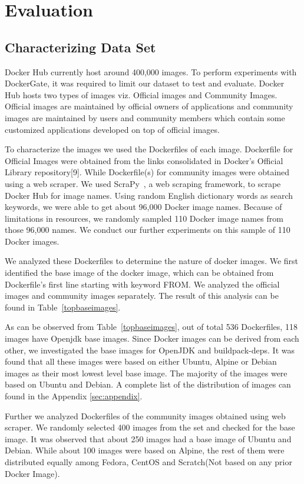 \section{Evaluation}
\label{sec:eval}

\subsection{Characterizing Data Set}

Docker Hub currently host around 400,000 images. To perform experiments with DockerGate, it was required to limit our dataset to test and evaluate. Docker Hub hosts two types of images viz. Official images and Community Images. Official images are maintained by official owners of applications and community images are maintained by users and community members which contain some customized applications developed on top of official images.

To characterize the images we used the Dockerfiles of each image. Dockerfile for Official Images were obtained from the links consolidated in Docker’s Official Library repository[9]. While Dockerfile(s) for community images were obtained using a web scraper. We used ScraPy~\cite{scrapy}, a web scraping framework, to scrape Docker Hub for image names. Using random English dictionary words as search keywords, we were able to get about 96,000 Docker image names. Because of limitations in resources, we randomly sampled 110 Docker image names from those 96,000 names. We conduct our further experiments on this sample of 110 Docker images.

We analyzed these Dockerfiles to determine the nature of docker images. We first identified the base image of the docker image, which can be obtained from Dockerfile’s first line starting with keyword FROM. We analyzed the official images and community images separately. The result of this analysis can be found in Table~\ref{topbaseimages}.

As can be observed from Table~\ref{topbaseimages}, out of total 536 Dockerfiles, 118 images have Openjdk base images. Since Docker images can be derived from each other, we investigated the base images for OpenJDK and buildpack-deps. It was found that all these images were based on either Ubuntu, Alpine or Debian images as their most lowest level base image. The majority of the images were based on Ubuntu and Debian. A complete list of the distribution of images can found in the Appendix \ref{sec:appendix}.

Further we analyzed Dockerfiles of the community images obtained using web scraper. We randomly selected 400 images from the set and checked for the base image. It was observed that about 250 images had a base image of Ubuntu and Debian. While  about 100 images were based on Alpine, the rest of them were distributed equally among Fedora, CentOS and Scratch(Not based on any prior Docker Image).


